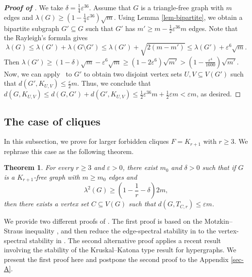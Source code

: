 \documentclass[11pt,a4paper]{article}
\newtheorem{theorem}{Theorem}[section]
\theoremstyle{definition}
\theoremstyle{remark}
\begin{document}
\begin{proof}[{\bf Proof of }]
We take $\delta = \frac{1}{4}\varepsilon^{36}$. 
Assume that $G$ is a triangle-free graph with $m$ edges and $\lambda (G)\ge (1- \frac{1}{4}\varepsilon^{36})\sqrt{m}$. 
Using Lemma \ref{lem-bipartite}, we obtain a bipartite subgraph $G'\subseteq G$ such that $G'$ has $m'\ge m - \frac{1}{2}\varepsilon^{36} m $ edges. 
Note that the Rayleigh's formula gives 
$$\lambda (G)\le \lambda (G') + \lambda (G\setminus G') \le \lambda (G') + \sqrt{2(m-m')}\le \lambda (G') + \varepsilon^6\sqrt{m}.$$ 
Then $\lambda (G')\ge (1-\delta)\sqrt{m} - \varepsilon^6 \sqrt{m} \ge (1-2\varepsilon^6) \sqrt{m'}> (1-\frac{\varepsilon^4}{1600})\sqrt{m'}$. Now, we can apply~ to $G'$ to obtain two disjoint vertex sets $U,V \subseteq V(G')$ such that $d(G',K_{U,V})\le \frac{\varepsilon}{2}m$. Thus, we conclude that $d(G,K_{U,V})\le d(G,G') + d(G',K_{U,V})\le \frac{1}{2}\varepsilon^{36} m + \frac{1}{2}\varepsilon m< \varepsilon m$, as desired. 
\end{proof}


\subsection{The case of cliques}\label{sec:F-clique}

In this subsection, we prove  for larger forbidden cliques $F = K_{r + 1}$ with $r\ge 3$. 
We rephrase this case as the following theorem. 

\begin{theorem} 
\label{thm-stability-clique-4}
    For every $r\ge 3$ and $\varepsilon>0$, there exist $m_0$ and $\delta >0$ such that if $G$ is a $K_{r+1}$-free graph with $m\ge m_0$ edges and 
    \[ \lambda^2(G)\ge 
    \left( 1-\frac{1}{r}-\delta \right) 2m, \] 
    then there exists a vertex set $C\subseteq V(G)$ such that $d(G,T_{C,r})\le \varepsilon m$. 
\end{theorem}
 

We provide two different proofs of . 
The first proof is based on the Motzkin--Straus inequality , and then reduce the edge-spectral stability in  to the vertex-spectral stability in . 
The second alternative proof applies a recent result involving the stability of the Kruskal--Katona type result for hypergraphs. We present the first proof here and postpone the second proof to the Appendix \ref{sec-A}. 
\end{document}
